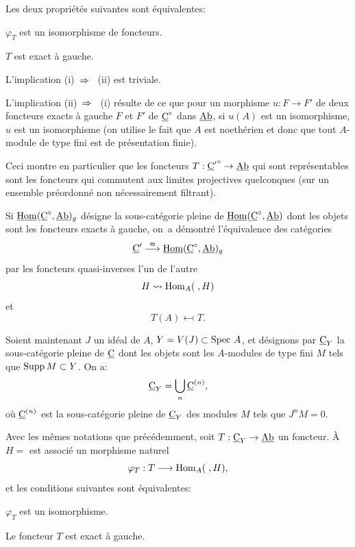 \begin{proposition} \label{IV.1.1}
Les deux propri\'et\'es suivantes sont \'equivalentes:
\begin{enumeratei}
\item
$\varphi_{T}$ est un isomorphisme de foncteurs.

\item
$T$ est exact \`a gauche.
\end{enumeratei}
\end{proposition}

L'implication (i)~$\To$~ (ii) est triviale.

L'implication (ii)~$\To$~ (i) r\'esulte de ce que pour un morphisme $u:F\to F'$ de deux foncteurs \ignorespaces exacts \`a gauche $F$ et $F'$ de $\underline{\mathrm{C}}^{\circ}$ dans $\underline{\mathrm{Ab}}$, si $u(A)$ est un isomorphisme, $u$ est un isomorphisme (on utilise le fait que $A$ est noeth\'erien et donc que tout $A$-module de type fini est de pr\'esentation finie).

\begin{remarque} \label{IV.1.2}
Ceci montre en particulier que les foncteurs $T:{\ccat'}^{\circ}\to \Ab$ qui sont repr\'esentables sont les foncteurs qui commutent aux limites projectives quelconques (sur un ensemble pr\'eordonn\'e non n\'ecessairement filtrant).
\end{remarque}

Si $\mathop{\underline{\mathrm{Hom}}}\nolimits (\underline{\mathrm{C}}^{\circ}, \underline{\mathrm{Ab}})_{g}$ d\'esigne la sous-cat\'egorie pleine de $\mathop{\underline{\mathrm{Hom}}}\nolimits (\underline{\mathrm{C}}^{\circ}, \underline{\mathrm{Ab}})$ dont les objets sont les foncteurs exacts \`a gauche, on~a d\'emontr\'e l'\'equivalence des cat\'egories
\[
\ccat' \overset{\thickapprox}{\to} \mathop{\underline{\mathrm{Hom}}}\nolimits (\ccat^{\circ}, \Ab)_{g}
\]
par les foncteurs quasi-inverses l'un de l'autre
\[
H \rightsquigarrow\operatorname{Hom}_{A}(\;, H)
\]
et
\[
T(A) \leftarrowtail T.
\]

Soient maintenant $J$ un id\'eal de $A$, $Y=V(J)\subset \operatorname{Spec}\, A$, et d\'esignons par $\underline{\mathrm{C}}_{Y}$ la sous-cat\'egorie pleine de $\underline{\mathrm{C}}$ dont les objets sont les $A$-modules de type fini $M$ tels que $\operatorname{Supp} M\subset Y$. On a:
\[
\underline{\mathrm{C}}_{Y}=\bigcup_{n}\underline{\mathrm{C}}^{(n)},
\]
o\`u $\underline{\mathrm{C}}^{(n)}$ est la sous-cat\'egorie pleine de $\underline{\mathrm{C}}_{Y}$ des modules $M$ tels que $J^{n}M=0$.

\begin{proposition} \label{IV.1.3}
Avec les m\^emes notations que pr\'ec\'edemment, soit $T:\ccat_{Y}\to \Ab$ un foncteur. \`A $H=$ est associ\'e un morphisme naturel
\[
\varphi_{T}: T\to \Hom_{A}(\;, H),
\]
et les conditions suivantes sont \'equivalentes:
\begin{enumeratei}
\item
$\varphi_{T}$ est un isomorphisme.

\item
Le foncteur $T$ est exact \`a gauche.
\end{enumeratei}
\end{proposition}

